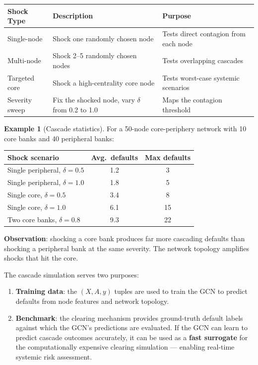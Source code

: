 \documentclass[11pt, a4paper]{article}
\theoremstyle{definition}
\newtheorem{example}{Example}[section]
\theoremstyle{plain}
\theoremstyle{remark}
\begin{document}
\begin{center}
\begin{tabular}{@{}p{3.5cm}p{4cm}p{5cm}@{}}
\toprule
\textbf{Shock Type} & \textbf{Description} & \textbf{Purpose} \\
\midrule
Single-node         & Shock one randomly chosen node
                    & Tests direct contagion from each node \\[4pt]
Multi-node          & Shock 2--5 randomly chosen nodes
                    & Tests overlapping cascades \\[4pt]
Targeted core       & Shock a high-centrality core node
                    & Tests worst-case systemic scenarios \\[4pt]
Severity sweep      & Fix the shocked node, vary $\delta$ from 0.2 to 1.0
                    & Maps the contagion threshold \\
\bottomrule
\end{tabular}
\end{center}

\begin{example}[Cascade statistics]\label{ex:cascade-stats}
For a 50-node core-periphery network with 10 core banks and 40 peripheral banks:

\begin{center}
\begin{tabular}{@{}lcc@{}}
\toprule
\textbf{Shock scenario} & \textbf{Avg.\ defaults} & \textbf{Max defaults} \\
\midrule
Single peripheral, $\delta = 0.5$  & 1.2 & 3  \\
Single peripheral, $\delta = 1.0$  & 1.8 & 5  \\
Single core, $\delta = 0.5$        & 3.4 & 8  \\
Single core, $\delta = 1.0$        & 6.1 & 15 \\
Two core banks, $\delta = 0.8$     & 9.3 & 22 \\
\bottomrule
\end{tabular}
\end{center}

\textbf{Observation}: shocking a core bank produces far more cascading defaults
than shocking a peripheral bank at the same severity.
The network topology amplifies shocks that hit the core.
\end{example}

\begin{keyresult}
The cascade simulation serves two purposes:
\begin{enumerate}
    \item \textbf{Training data}: the $(X, A, y)$ tuples are used to train the GCN
          to predict defaults from node features and network topology.
    \item \textbf{Benchmark}: the clearing mechanism provides ground-truth default
          labels against which the GCN's predictions are evaluated.
          If the GCN can learn to predict cascade outcomes accurately, it can be
          used as a \textbf{fast surrogate} for the computationally expensive clearing
          simulation --- enabling real-time systemic risk assessment.
\end{enumerate}
\end{keyresult}
\end{document}
